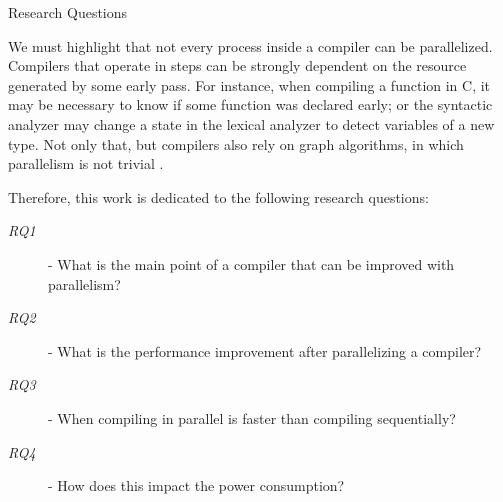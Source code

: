 \begin{section}{Research Questions}\label{sec:rq}


We must highlight that not every process inside a compiler can be parallelized.
Compilers that operate in steps can be strongly dependent on the resource
generated by some early pass.  For instance, when compiling a function in C, it
may be necessary to know if some function was declared early; or the syntactic
analyzer may change a state in the lexical analyzer to detect variables of a
new type. Not only that, but compilers also rely on graph algorithms, in
which parallelism is not trivial \citep{lumsdaine2007challenges}.

Therefore, this work is dedicated to the following research questions:

\begin{description}
    \item[\textit{RQ1}] - What is the main point of a compiler that can be improved with parallelism?
    \item[\textit{RQ2}] - What is the performance improvement after parallelizing a compiler?
	\item[\textit{RQ3}] - When compiling in parallel is faster than compiling sequentially?
	\item[\textit{RQ4}] - How does this impact the power consumption?
\end{description}

%



\end{section}
